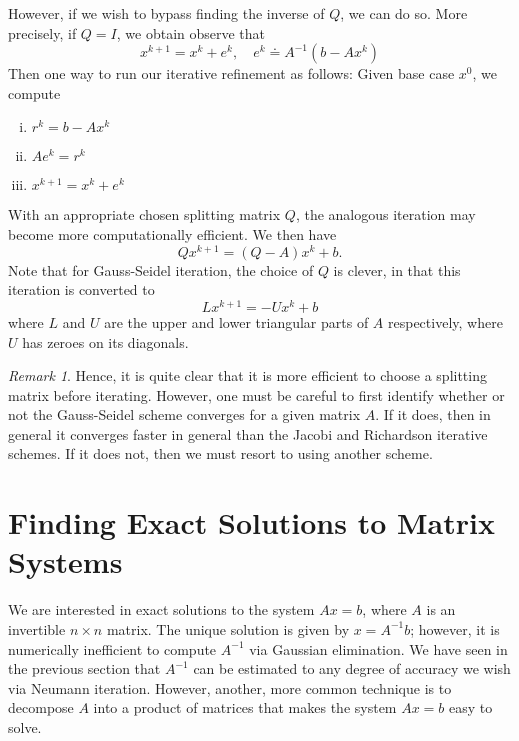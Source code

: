\documentclass[12pt]{article}
\theoremstyle{plain}
\theoremstyle{definition}
\theoremstyle{remark}
\newtheorem*{remark}{Remark}
\numberwithin{equation}{section}  %
\begin{document}
However, if we wish to bypass finding the inverse of $Q$, we can do so. More precisely, if
$Q = I$, we obtain
observe that
\begin{equation*}
x^{k+1} = x^{k} + e^{k}, \quad e^{k} \doteq A^{-1}(b - Ax^{k})
\end{equation*}
Then one way to run our iterative refinement as follows: Given base case $x^{0}$, we compute 
\begin{enumerate}[i)]
\item $r^{k} = b - Ax^{k}$
\item $Ae^{k} = r^{k}$
\item $x^{k+1} = x^{k} + e^{k}$
\end{enumerate}
With an appropriate chosen splitting matrix $Q$, the analogous iteration may become
more computationally efficient. We then have
\begin{equation*}
Qx^{k+1} = (Q - A)x^{k} + b.
\end{equation*}
Note that for Gauss-Seidel iteration, the choice of $Q$ is clever, in that this
iteration  is converted to 
\begin{equation*}
L x^{k+1} = - U x^{k} + b
\end{equation*}
where $L$ and $U$ are the upper and lower triangular parts of $A$ respectively,
where $U$ has zeroes on its diagonals. 

\begin{remark}
Hence, it is quite clear that it is more efficient to choose a splitting matrix
before iterating. However, one must be careful to first identify whether or not
the Gauss-Seidel scheme converges for a given matrix $A$. If it does, then in
general it converges faster in general than the Jacobi and Richardson iterative
schemes. If it does not, then we must resort to using another scheme.
\end{remark}
\section{Finding Exact Solutions to Matrix Systems}
We are interested in exact solutions to the system $Ax = b$, 
where $A$ is an invertible $n \times n$ matrix. The unique solution
is given by $x = A^{-1}b$; however, it is numerically inefficient
to compute $A^{-1}$ via Gaussian elimination. We have seen in the previous
section that $A^{-1}$ can be estimated to any degree of accuracy we wish
via Neumann iteration. However, another, more common technique is 
to decompose $A$ into a product of matrices that makes the system $Ax = b$
easy to solve. 
\end{document}
